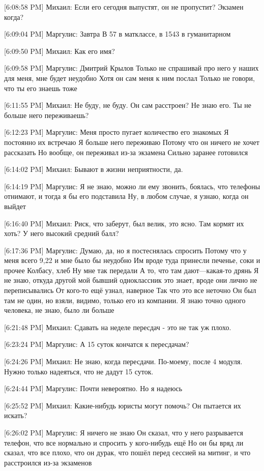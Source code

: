 \documentclass{article}
\begin{document}
[6:08:58 PM] Михаил:
Если его сегодня выпустят, он не пропустит? Экзамен когда?

[6:09:04 PM] Маргулис:
Завтра
 В 57 в матклассе, в 1543 в гуманитарном

[6:09:50 PM] Михаил:
Как его имя?

[6:09:58 PM] Маргулис:
Дмитрий Крылов
 Только не спрашивай про него у наших для меня, мне будет неудобно
 Хотя он сам меня к ним послал
 Только не говори, что ты его знаешь тоже

[6:11:55 PM] Михаил:
Не буду, не буду. Он сам расстроен? Не знаю его.
 Ты не больше него переживаешь?

[6:12:23 PM] Маргулис:
Меня просто пугает количество его знакомых
 Я постоянно их встречаю
 Я больше него переживаю
 Потому что он ничего не хочет рассказать
 Но вообще, он переживал из-за экзамена
 Сильно заранее готовился

[6:14:02 PM] Михаил:
Бывают в жизни неприятности, да.

[6:14:19 PM] Маргулис:
Я не знаю, можно ли ему звонить, боялась, что телефоны отнимают, и тогда я бы его подставила
 Ну, в любом случае, я узнаю, когда он выйдет

[6:16:40 PM] Михаил:
Риск, что заберут, был велик, это ясно. Там кормят их хоть?
 У него высокий средний балл?

[6:17:36 PM] Маргулис:
Думаю, да, но я постеснялась спросить
 Потому что у меня всего 9,22 и мне было бы неудобно
 Им вроде туда принесли печенье, соки и прочее
 Колбасу, хлеб
 Ну мне так передали
 А то, что там дают—какая-то дрянь
 Я не знаю, откуда другой мой бывший одноклассник это знает, вроде они лично не переписывались
 От кого-то ещё узнал, наверное
 Так что это все неточно
 Он был там не один, но взяли, видимо, только его из компании. Я знаю точно одного человека, не знаю, было ли больше

[6:21:48 PM] Михаил:
Сдавать на неделе пересдач - это не так уж плохо.

[6:23:24 PM] Маргулис:
А 15 суток кончатся к пересдачам?

[6:24:26 PM] Михаил:
Не знаю, когда пересдачи. По-моему, после 4 модуля. Нужно только надеяться, что не дадут 15 суток.

[6:24:44 PM] Маргулис:
Почти невероятно. Но я надеюсь

[6:25:52 PM] Михаил:
Какие-нибудь юристы могут помочь? Он пытается их искать?

[6:26:02 PM] Маргулис:
Я ничего не знаю
 Он сказал, что у него разрывается телефон, что все нормально и спросить у кого-нибудь ещё
 Но он бы вряд ли сказал, что все плохо, что он дурак, что пошёл перед сессией на митинг, и что расстроился из-за экзаменов
\end{document}
